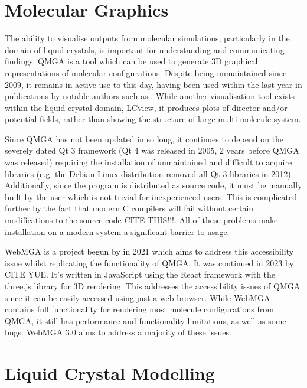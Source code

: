\section{Molecular Graphics}
The ability to visualise outputs from molecular simulations, particularly in the domain of liquid crystals, is important for understanding and communicating findings. QMGA\cite{gabriel2008molecular} is a tool which can be used to generate 3D graphical representations of molecular configurations. Despite being unmaintained since 2009\cite{qmga_release}, it remains in active use to this day, having been used within the last year in publications by notable authors such as \textcite{ramirez2023densest,mazzilli2023phase}. While another visualisation tool exists within the liquid crystal domain, LCview\cite{james2006finite,LCview}, it produces plots of director and/or potential fields, rather than showing the structure of large multi-molecule system.

Since QMGA has not been updated in so long, it continues to depend on the severely dated Qt 3 framework (Qt 4 was released in 2005, 2 years before QMGA was released) requiring the installation of unmaintained and difficult to acquire libraries (e.g. the Debian Linux distribution removed all Qt 3 libraries in 2012\cite{qt3_removed}). Additionally, since the program is distributed as source code, it must be manually built by the user which is not trivial for inexperienced users. This is complicated further by the fact that modern C compilers will fail without certain modifications to the source code CITE THIS!!!. All of these problems make installation on a modern system a significant barrier to usage.

WebMGA is a project begun by \textcite{Battistini_2021} in 2021 which aims to address this accessibility issue whilst replicating the functionality of QMGA. It was continued in 2023 by CITE YUE. It's written in JavaScript using the React framework with the three.js library for 3D rendering. This addresses the accessibility issues of QMGA since it can be easily accessed using just a web browser. While WebMGA contains full functionality for rendering most molecule configurations from QMGA, it still has performance and functionality limitations, as well as some bugs. WebMGA 3.0 aims to address a majority of these issues.

\section{Liquid Crystal Modelling}

